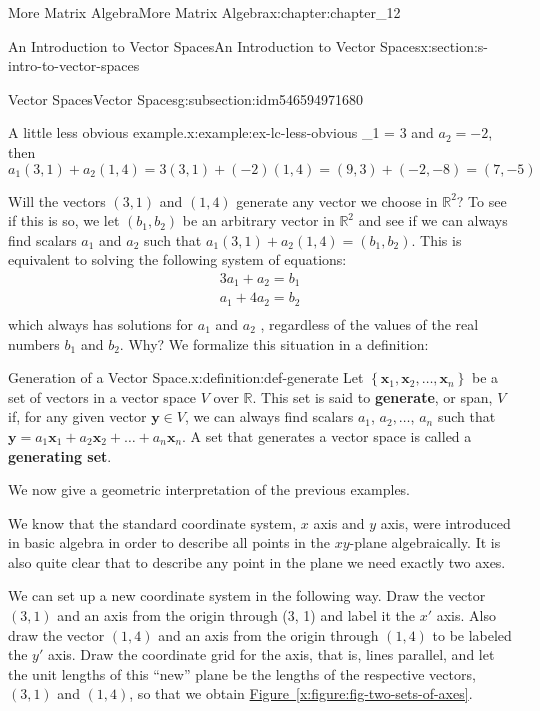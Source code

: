 \documentclass[oneside,10pt,]{book}
\newcommand{\xreffont}{\relax}
\newcommand{\terminology}[1]{\textbf{#1}}
\numberwithin{equation}{section}
\renewcommand{\vec}[1]{\mathbf{#1}}
\begin{document}
\begin{chapterptx}{More Matrix Algebra}{}{More Matrix Algebra}{}{}{x:chapter:chapter_12}
\begin{sectionptx}{An Introduction to Vector Spaces}{}{An Introduction to Vector Spaces}{}{}{x:section:s-intro-to-vector-spaces}
\begin{subsectionptx}{Vector Spaces}{}{Vector Spaces}{}{}{g:subsection:idm546594971680}
\begin{example}{A little less obvious example.}{x:example:ex-lc-less-obvious}
_1 = 3\) and \(a_2 = -2\), then%
\begin{equation*}
a_1(3, 1) + a_2 (1, 4) = 3 (3, 1) +(-2) (1,4) = (9, 3) +(-2,-8) = (7, -5)
\end{equation*}
%
\end{example}
Will the vectors \((3, 1)\) and \((1,4)\) generate any vector we choose in \(\mathbb{R}^2\)?  To see if this is so, we let \(\left(b_1,b_2\right)\) be an arbitrary vector in \(\mathbb{R}^2\) and see if we can always find scalars \(a_1\) and \(a_2\) such that \(a_1(3, 1) + a_2 (1, 4)= \left(b_1,b_2\right)\). This is equivalent to solving the following system of equations:%
\begin{equation*}
\begin{array}{c}
3a_1+ a_2 =b_1\\
a_1+4a_2 =b_2\\
\end{array}
\end{equation*}
which always has solutions for \(a_1\) and \(a_2\) , regardless of the values of the real numbers \(b_1\) and \(b_2\). Why?   We formalize this situation in a definition:%
\begin{definition}{Generation of a Vector Space.}{x:definition:def-generate}%
%
%
Let \(\left\{\vec{x}_1,\vec{x}_2, \ldots ,\vec{x}_n\right\}\) be a set of vectors in a vector space \(V\) over \(\mathbb{R}\). This set is said to \terminology{generate}, or span, \(V\) if, for any given vector \(\vec{y} \in V\), we can always find scalars \(a_1\), \(a_2,
\ldots\), \(a_n\) such that \(\vec{y} = a_1 \vec{x}_1+a_2 \vec{x}_2+\ldots +a_n \vec{x}_n\).  A set that generates a vector space is called a \terminology{generating set}.%
\end{definition}
We now give a geometric interpretation of the previous examples.%
\par
We know that the standard coordinate system, \(x\) axis and \(y\) axis, were introduced in basic algebra in order to describe all points in the \(xy\)-plane algebraically. It is also quite clear that to describe any point in the plane we need exactly two axes.%
\par
We can set up a new coordinate system in the following way.  Draw the vector \((3, 1)\) and an axis from the origin through (3, 1) and label it the \(x'\) axis. Also draw the vector \((1,4)\) and an axis from the origin through \((1,4)\) to be labeled the \(y'\) axis. Draw the coordinate grid for the axis, that is, lines parallel, and let the unit lengths of this ``new'' plane be the lengths of the respective vectors, \((3, 1)\) and \((1, 4)\), so that we obtain \hyperref[x:figure:fig-two-sets-of-axes]{Figure~{\xreffont\ref{x:figure:fig-two-sets-of-axes}}}.%

\end{subsectionptx}
\end{sectionptx}
\end{chapterptx}
\end{document}
